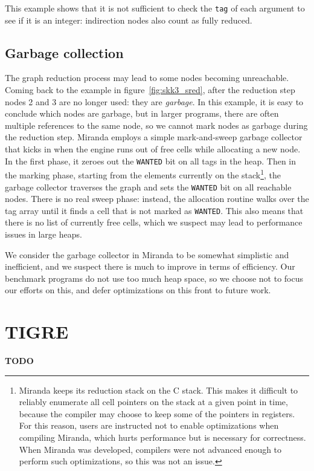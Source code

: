 \documentclass[conference]{IEEEtran}
\begin{document}
This example shows that it is not sufficient to check the \texttt{tag} of each argument to see if it is an integer: indirection nodes also count as fully reduced.

\subsection{Garbage collection}
The graph reduction process may lead to some nodes becoming unreachable.
Coming back to the example in figure~\ref{fig:skk3_sred}, after the reduction step nodes 2 and 3 are no longer used: they are \textit{garbage}.
In this example, it is easy to conclude which nodes are garbage, but in larger programs, there are often multiple references to the same node, so we cannot mark nodes as garbage during the reduction step.
Miranda employs a simple mark-and-sweep garbage collector that kicks in when the engine runs out of free cells while allocating a new node.
In the first phase, it zeroes out the \texttt{WANTED} bit on all tags in the heap.
Then in the marking phase, starting from the elements currently on the stack\footnote{
    Miranda keeps its reduction stack on the C stack.
    This makes it difficult to reliably enumerate all cell pointers on the stack at a given point in time, because the compiler may choose to keep some of the pointers in registers.
    For this reason, users are instructed not to enable optimizations when compiling Miranda, which hurts performance but is necessary for correctness.
    When Miranda was developed, compilers were not advanced enough to perform such optimizations, so this was not an issue.
}, the garbage collector traverses the graph and sets the \texttt{WANTED} bit on all reachable nodes.
There is no real sweep phase: instead, the allocation routine walks over the tag array until it finds a cell that is not marked as \texttt{WANTED}.
This also means that there is no list of currently free cells, which we suspect may lead to performance issues in large heaps.

We consider the garbage collector in Miranda to be somewhat simplistic and inefficient, and we suspect there is much to improve in terms of efficiency.
Our benchmark programs do not use too much heap space, so we choose not to focus our efforts on this, and defer optimizations on this front to future work.

\section{TIGRE}
\label{sec:tigre}
\textbf{TODO}
\end{document}
